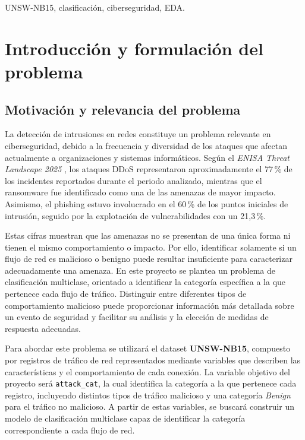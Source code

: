 \documentclass[conference]{IEEEtran}
\begin{document}
    \begin{IEEEkeywords}
    UNSW-NB15, clasificación, ciberseguridad, EDA.
    \end{IEEEkeywords}

    \section{Introducción y formulación del problema}

    \subsection{Motivación y relevancia del problema}
La detección de intrusiones en redes constituye un problema relevante 
en ciberseguridad, debido a la frecuencia y diversidad de los ataques 
que afectan actualmente a organizaciones y sistemas informáticos. 
Según el \textit{ENISA Threat Landscape 2025} \cite{enisa2025}, 
los ataques DDoS representaron aproximadamente el 77\,\% de los 
incidentes reportados durante el periodo analizado, mientras que el 
ransomware fue identificado como una de las amenazas de mayor impacto. 
Asimismo, el phishing estuvo involucrado en el 60\,\% de los puntos 
iniciales de intrusión, seguido por la explotación de vulnerabilidades 
con un 21,3\,\%.

Estas cifras muestran que las amenazas no se presentan de una única forma ni tienen el mismo comportamiento o impacto. Por ello, identificar solamente si un flujo de red es malicioso o benigno puede resultar insuficiente para caracterizar adecuadamente una amenaza. En este proyecto se plantea un problema de clasificación multiclase, orientado a identificar la categoría específica a la que pertenece cada flujo de tráfico. Distinguir entre diferentes tipos de comportamiento malicioso puede proporcionar información más detallada sobre un evento de seguridad y facilitar su análisis y la elección de medidas de respuesta adecuadas.

Para abordar este problema se utilizará el dataset \textbf{UNSW-NB15}, compuesto por registros de tráfico de red representados mediante variables que describen las características y el comportamiento de cada conexión. La variable objetivo del proyecto será \texttt{attack\_cat}, la cual identifica la categoría a la que pertenece cada registro, incluyendo distintos tipos de tráfico malicioso y una categoría \textit{Benign} para el tráfico no malicioso. A partir de estas variables, se buscará construir un modelo de clasificación multiclase capaz de identificar la categoría correspondiente a cada flujo de red.
\end{document}

